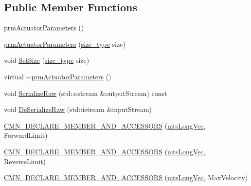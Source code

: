\subsection*{Public Member Functions}
\begin{DoxyCompactItemize}
\item 
\hyperlink{classprm_actuator_parameters_a9ad6bc60dc8bbfc8cffc764c3366efe0}{prm\+Actuator\+Parameters} ()
\item 
\hyperlink{classprm_actuator_parameters_ac2f872f92b41ce493edc9e9361de24ef}{prm\+Actuator\+Parameters} (\hyperlink{classprm_actuator_parameters_a0b8bdcb6c28e1f3028d93cf9b6ca1ee0}{size\+\_\+type} size)
\item 
void \hyperlink{classprm_actuator_parameters_a36ea3d84dd6a90830e028ec5d920cc78}{Set\+Size} (\hyperlink{classprm_actuator_parameters_a0b8bdcb6c28e1f3028d93cf9b6ca1ee0}{size\+\_\+type} size)
\item 
virtual \hyperlink{classprm_actuator_parameters_a40956ddd7a494305d9ad5ce2aa61171f}{$\sim$prm\+Actuator\+Parameters} ()
\item 
void \hyperlink{classprm_actuator_parameters_a6f2304ef6f0362ac366a920f9ceea746}{Serialize\+Raw} (std\+::ostream \&output\+Stream) const 
\item 
void \hyperlink{classprm_actuator_parameters_a795018ccea6a67b80dd75c84598fb8c9}{De\+Serialize\+Raw} (std\+::istream \&input\+Stream)
\end{DoxyCompactItemize}
{\bf }\par
\begin{DoxyCompactItemize}
\item 
\hyperlink{classprm_actuator_parameters_a9447a49754acbe582db1d51dfb2824ef}{C\+M\+N\+\_\+\+D\+E\+C\+L\+A\+R\+E\+\_\+\+M\+E\+M\+B\+E\+R\+\_\+\+A\+N\+D\+\_\+\+A\+C\+C\+E\+S\+S\+O\+R\+S} (\hyperlink{mts_vector_8h_a3e011934ab1b5774f640a7bb70d9a672}{mts\+Long\+Vec}, Forward\+Limit)
\end{DoxyCompactItemize}

{\bf }\par
\begin{DoxyCompactItemize}
\item 
\hyperlink{classprm_actuator_parameters_a1eac2da8fad6fb16fb7ddac367bf1cdf}{C\+M\+N\+\_\+\+D\+E\+C\+L\+A\+R\+E\+\_\+\+M\+E\+M\+B\+E\+R\+\_\+\+A\+N\+D\+\_\+\+A\+C\+C\+E\+S\+S\+O\+R\+S} (\hyperlink{mts_vector_8h_a3e011934ab1b5774f640a7bb70d9a672}{mts\+Long\+Vec}, Reverse\+Limit)
\end{DoxyCompactItemize}

{\bf }\par
\begin{DoxyCompactItemize}
\item 
\hyperlink{classprm_actuator_parameters_a9d1f39b478007a7b8ff69d4799f47b23}{C\+M\+N\+\_\+\+D\+E\+C\+L\+A\+R\+E\+\_\+\+M\+E\+M\+B\+E\+R\+\_\+\+A\+N\+D\+\_\+\+A\+C\+C\+E\+S\+S\+O\+R\+S} (\hyperlink{mts_vector_8h_a3e011934ab1b5774f640a7bb70d9a672}{mts\+Long\+Vec}, Max\+Velocity)
\end{DoxyCompactItemize}

